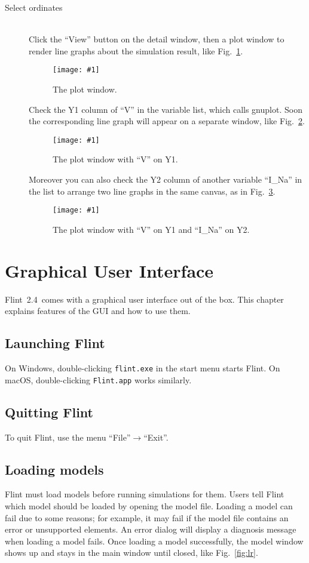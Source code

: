 \documentclass[a4paper,10pt]{report}
\def\FlintVersion{2.4}
\def\Flint{Flint~\FlintVersion}
\newcommand{\filename}[1]{{\tt #1}}
\newcommand\FigureOfImage[2]{\begin{figure}[h]
  \centering
  \texttt{[image: \#1]}
  \caption{#2}\label{fig:#1}
\end{figure}}
\begin{document}
\begin{description}
\item[Select ordinates] \hfill \\
Click the ``View'' button on the detail window, then a plot window to render
line graphs about the simulation result, like Fig.~\ref{fig:hh-plot}.
\FigureOfImage{hh-plot}{The plot window.}
Check the Y1 column of ``V'' in the variable list, which calls gnuplot.
Soon the corresponding line graph will appear on a separate window,
like Fig.~\ref{fig:hh-plot-v}.
\FigureOfImage{hh-plot-v}{The plot window with ``V'' on Y1.}
Moreover you can also check the Y2 column of another variable ``I\_Na'' in the
list to arrange two line graphs in the same canvas, as in
Fig.~\ref{fig:hh-plot-v-ina}.
\FigureOfImage{hh-plot-v-ina}{The plot window with ``V'' on Y1 and ``I\_Na''
on Y2.}
\end{description}



\chapter{Graphical User Interface}
\Flint\ comes with a graphical user interface out of the box. This chapter
explains features of the GUI and how to use them.

\section{Launching Flint}
On Windows, double-clicking \filename{flint.exe} in the start menu starts Flint.
On macOS, double-clicking \filename{Flint.app} works similarly.

\section{Quitting Flint}
To quit Flint, use the menu ``File''$\rightarrow$``Exit''.

\section{Loading models}
Flint must load models before running simulations for them.
Users tell Flint which model should be loaded by opening the model file.
Loading a model can fail due to some reasons; for example, it may fail if
the model file contains an error or unsupported elements.
An error dialog will display a diagnosis message when loading a model fails.
Once loading a model successfully, the model window shows up and stays
in the main window until closed, like Fig.~\ref{fig:lr}.
\end{document}
